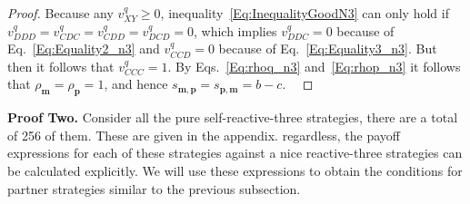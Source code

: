 \documentclass{article}
\theoremstyle{definition}
\begin{document}
\begin{proof}
Because any $v^q_{XY}\!\ge\!0$, inequality~\eqref{Eq:InequalityGoodN3} can only
hold if $v^q_{DDD}\!=\!v^q_{CDC}\!=\!v^q_{CDD}\!=\!v^q_{DCD}\!=\!0$, which
implies $v^q_{DDC}\!=\!0$ because of Eq.~\eqref{Eq:Equality2_n3} and $v^q_{CCD}\!=\!0$
because of Eq.~\eqref{Eq:Equality3_n3}.
But then it follows that $v^q_{CCC}\!=\!1$. By
Eqs.~\eqref{Eq:rhoq_n3} and~\eqref{Eq:rhop_n3} it follows that
$\rho_\mathbf{m}\!=\!\rho_\mathbf{p}\!=\!1$, and hence
$s_{\mathbf{m}, \mathbf{p}}\!=\!s_{\mathbf{p}, \mathbf{m}}\!=\!b\!-\!c$. 
\
\end{proof}

{\bf Proof Two.} Consider all the pure self-reactive-three strategies, there are
a total of 256 of them. These are given in the appendix. regardless, the payoff
expressions for each of these strategies against a nice reactive-three
strategies can be calculated explicitly. We will use these expressions to obtain
the conditions for partner strategies similar to the previous subsection.
\end{document}

